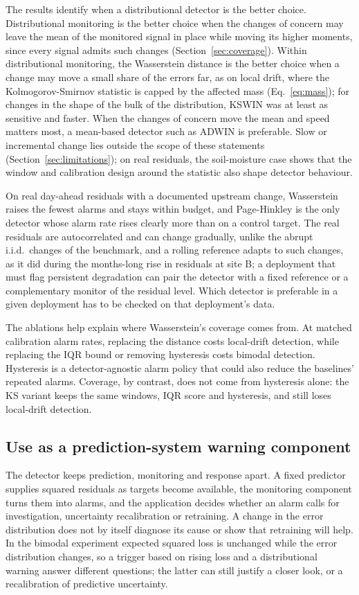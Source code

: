 \documentclass[preprint,12pt]{elsarticle}
\begin{document}
The results identify when a distributional detector is the better choice. Distributional monitoring is the better choice when the changes of concern may leave the mean of the monitored signal in place while moving its higher moments, since every signal admits such changes (Section~\ref{sec:coverage}). Within distributional monitoring, the Wasserstein distance is the better choice when a change may move a small share of the errors far, as on local drift, where the Kolmogorov-Smirnov statistic is capped by the affected mass (Eq.~\eqref{eq:mass}); for changes in the shape of the bulk of the distribution, KSWIN was at least as sensitive and faster. When the changes of concern move the mean and speed matters most, a mean-based detector such as ADWIN is preferable. Slow or incremental change lies outside the scope of these statements (Section~\ref{sec:limitations}); on real residuals, the soil-moisture case shows that the window and calibration design around the statistic also shape detector behaviour.

On real day-ahead residuals with a documented upstream change, Wasserstein raises the fewest alarms and stays within budget, and Page-Hinkley is the only detector whose alarm rate rises clearly more than on a control target. The real residuals are autocorrelated and can change gradually, unlike the abrupt i.i.d.\ changes of the benchmark, and a rolling reference adapts to such changes, as it did during the months-long rise in residuals at site B; a deployment that must flag persistent degradation can pair the detector with a fixed reference or a complementary monitor of the residual level. Which detector is preferable in a given deployment has to be checked on that deployment's data.

The ablations help explain where Wasserstein's coverage comes from. At matched calibration alarm rates, replacing the distance costs local-drift detection, while replacing the IQR bound or removing hysteresis costs bimodal detection. Hysteresis is a detector-agnostic alarm policy that could also reduce the baselines' repeated alarms. Coverage, by contrast, does not come from hysteresis alone: the KS variant keeps the same windows, IQR score and hysteresis, and still loses local-drift detection.

\subsection{Use as a prediction-system warning component}
\label{sec:operational}
The detector keeps prediction, monitoring and response apart. A fixed predictor supplies squared residuals as targets become available, the monitoring component turns them into alarms, and the application decides whether an alarm calls for investigation, uncertainty recalibration or retraining. A change in the error distribution does not by itself diagnose its cause or show that retraining will help. In the bimodal experiment expected squared loss is unchanged while the error distribution changes, so a trigger based on rising loss and a distributional warning answer different questions; the latter can still justify a closer look, or a recalibration of predictive uncertainty.
\end{document}
